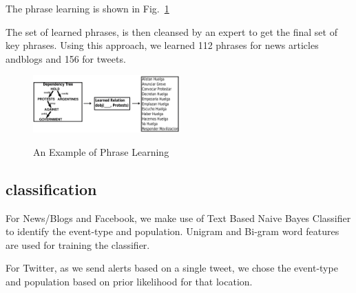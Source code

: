 The phrase learning is shown in Fig.~\ref{fig:phraselearning}

The set of learned phrases, is then cleansed by an expert to get the final set of key phrases.
Using this approach, we learned 112 phrases for news articles andblogs and 156 for tweets.

\begin{figure}
\caption{An Example of Phrase Learning}
\includegraphics[width=0.5\textwidth]{figures/phraseLearning}
\label{fig:phraselearning}
\end{figure}


\subsection{classification}

For News/Blogs and Facebook, we make use of Text Based Naive Bayes
Classifier to identify the event-type and population. Unigram and
Bi-gram word features are used for training the classifier.

For Twitter, as we send alerts based on a single tweet, we chose the
event-type and population based on prior likelihood for that location.

